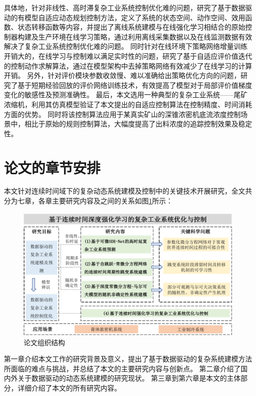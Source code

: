 具体地，针对非线性、高时滞复杂工业系统控制优化难的问题，研究了基于数据驱动的有模型自适应动态规划控制方法，定义了系统的状态空间、动作空间、效用函数、状态转移函数等内容，并提出了离线系统建模与在线强化学习相结合的原始控制器构建及生产环境在线学习策略，通过利用离线采集数据以及在线监测数据有效解决了复杂工业系统控制优化难的问题。
同时针对在线环境下策略网络增量训练开销大的，在线学习与控制难以满足实时性的问题，研究了基于自适应评价值迭代的控制动作求解算法，通过在模型架构中去掉策略网络有效减少了在线学习的计算开销。
另外，针对评价模块参数收敛慢、难以准确给出策略优化方向的问题，研究了基于短期经验回放的评价网络训练技术，有效提高了模型对于局部评价值梯度变化的敏感性及预测准确性。
最后，本文选用一种典型的复杂工业系统——尾矿浓缩机，利用其仿真模型验证了本文提出的自适应控制算法在控制精度、时间消耗方面的优势。
同时将该控制算法应用于某真实矿山的深锥浓密机底流浓度控制场景中，相比于原始的规则控制算法，大幅度提高了出料浓度的追踪控制效果及稳定性。

\section{论文的章节安排}

本文针对连续时间域下的复杂动态系统建模及控制中的关键技术开展研究，全文共分为七章，各章主要研究内容及之间的关系如图\ref{fig:structure}所示：
\begin{figure}
    \centering
    \includegraphics[width=0.95\linewidth]{figures/chapter1/structure.pdf}
    \caption{论文组织结构}
    \label{fig:structure}
\end{figure}

第一章介绍本文工作的研究背景及意义，提出了基于数据驱动的复杂系统建模方法所面临的难点与挑战，并总结了本文的主要研究内容与创新点。
第二章介绍了国内外关于数据驱动的动态系统建模的研究现状。
第三章到第六章是本文的主体部分，详细介绍了本文的所有研究内容。

